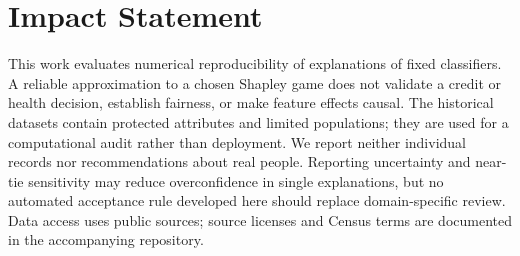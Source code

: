 \documentclass{article}
\begin{document}
\section*{Impact Statement}
This work evaluates numerical reproducibility of explanations of fixed classifiers. A reliable approximation to a chosen Shapley game does not validate a credit or health decision, establish fairness, or make feature effects causal. The historical datasets contain protected attributes and limited populations; they are used for a computational audit rather than deployment. We report neither individual records nor recommendations about real people. Reporting uncertainty and near-tie sensitivity may reduce overconfidence in single explanations, but no automated acceptance rule developed here should replace domain-specific review. Data access uses public sources; source licenses and Census terms are documented in the accompanying repository.



\clearpage
\appendix

\end{document}
